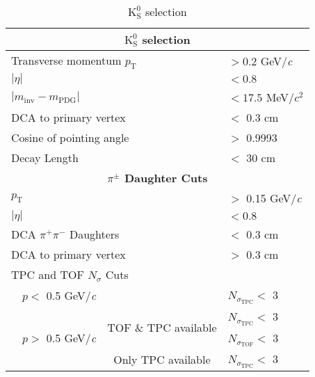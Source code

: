 \documentclass[ALICE,manyauthors]{cernphprep}
\newcommand{\Ks}{$\mathrm{K^{0}_{S}}$\xspace}
\begin{document}
\begin{table}[htbp]
 \centering
  \begin{tabular}{lc|c|l}
   \hline  
   \multicolumn{4}{c}{\textbf{\Ks selection}} \\
   \hline
   \multicolumn{3}{l|}{Transverse momentum $p_{\mathrm{T}}$} & $> 0.2$ GeV/\textit{c} \\
   \hline
   \multicolumn{3}{l|}{$|\eta|$} & $< 0.8$ \\
   \hline
   \multicolumn{3}{l|}{$|m_{\mathrm{inv}} - m_{\mathrm{PDG}}|$} & $< 17.5$ MeV/$c^{2}$ \\
   \hline
   \multicolumn{3}{l|}{DCA to primary vertex} & $<$ 0.3 cm \\
   \hline
   \multicolumn{3}{l|}{Cosine of pointing angle} & $>$ 0.9993 \\
   \hline
   \multicolumn{3}{l|}{Decay Length} & $<$ 30 cm \\
   \hline
      
   
   \multicolumn{4}{c}{\textbf{$\pi^{\pm}$ Daughter Cuts}} \\
   \hline
   \multicolumn{3}{l|}{$p_{\mathrm{T}}$} & $>$ 0.15 GeV/\textit{c} \\
   \hline
   \multicolumn{3}{l|}{$|\eta|$} &  $< 0.8$ \\
   \hline
   \multicolumn{3}{l|}{DCA $\pi^{+}\pi^{-}$ Daughters} & $<$ 0.3 cm \\
   \hline
   \multicolumn{3}{l|}{DCA to primary vertex} & $>$ 0.3 cm \\
   \hline
   \multicolumn{4}{l}{TPC and TOF $N_{\sigma}$ Cuts} \\
    & \multicolumn{1}{c}{$p <$ 0.5 GeV/\textit{c}} &  & $N_{\sigma_{\mathrm{TPC}}} <$ 3 \\
   \cline{2-4}
    & \multicolumn{1}{c}{\multirow{3}{*}{$p >$ 0.5 GeV/\textit{c}}} &  \multirow{2}{*}{TOF \& TPC available} & $N_{\sigma_{\mathrm{TPC}}} <$ 3 \\
    & \multicolumn{2}{c|}{} & $N_{\sigma_{\mathrm{TOF}}} <$ 3 \\
   \cline{3-4}
    & \multicolumn{1}{c}{} & Only TPC available & $N_{\sigma_{\mathrm{TPC}}} <$ 3 \\
   \hline   
  \end{tabular}
 \caption{\Ks selection}
 \label{tab:K0sCuts} 
\end{table}
\end{document}
